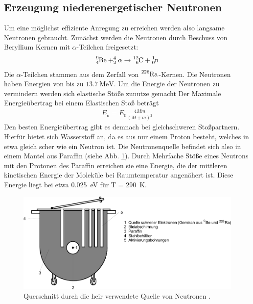 \subsection{Erzeugung niederenergetischer Neutronen}
Um eine möglichst effiziente Anregung zu erreichen werden also 
langsame Neutronen gebraucht.
Zunächst werden die Neutronen durch Beschuss von Beryllium Kernen mit 
$\alpha$-Teilchen freigesetzt:
\begin{align*}
    \ce{^{9}_{4}Be} + ^{4}_{2}\alpha \rightarrow \ce{^{12}_{6}C} + \ce{_{0}^{1}n}
\end{align*}
Die $\alpha$-Teilchen stammen aus dem Zerfall von $\ce{^{226}Ra}$-Kernen. 
Die Neutronen haben Energien von bis zu $\qty{13.7}{\mega\eV}$. 
Um die Energie der Neutronen zu vermindern werden sich elastische Stöße zunutze gemacht
Der Maximale Energieübertrag bei einem Elastischen Stoß beträgt
\begin{align*}
    E_\text{ü} = E_0 \frac{4Mm}{\left(M + m\right)^2}
\end{align*}
Den besten Energieübertrag gibt es demnach bei gleichschweren Stoßpartnern.
Hierfür bietet sich Wasserstoff an, da es aus nur einem Proton besteht, welches in etwa
gleich scher wie ein Neutron ist. 
Die Neutronenquelle befindet sich also in einem Mantel aus Paraffin (siehe Abb. \ref{fig:neutronenquelle}).
Durch Mehrfache Stöße eines Neutrons mit den Protonen des Paraffin erreichen sie eine
Energie, die der mittleren kinetischen Energie der Moleküle bei Raumtemperatur angenähert ist.
Diese Energie liegt bei etwa \qty{0.025}{\eV} für T = \qty{290}{\kelvin}.
\begin{figure}
    \centering
    \includegraphics{Abbildungen/Neutronenquelle.pdf}
    \caption{Querschnitt durch die heir verwendete Quelle von Neutronen \cite{man:v702}.}
    \label{fig:neutronenquelle}
\end{figure}



